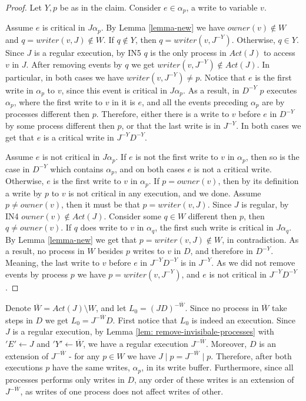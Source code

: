 \begin{proof}
	Let $Y,p$ be as in the claim. Consider $e \in \alpha_p$, a write to variable $v$. 
	
	Assume $e$ is critical in $J \alpha_p$. By Lemma \ref{lemma-new} we have $owner(v) \notin W$ and $q = writer(v,J) \notin W$. If $q \notin Y$, then $q = writer(v,J^{-Y})$. Otherwise, $q \in Y$. Since $J$ is a regular execution, by IN5 $q$ is the only process in $Act(J)$ to access $v$ in $J$. After removing events by $q$ we get $writer(v,J^{-Y}) \notin Act(J)$. In particular, in both cases we have $writer(v,J^{-Y}) \neq p$.
	Notice that $e$ is the first write in $\alpha_p$ to $v$, since this event is critical in $J \alpha_p$. As a result, in $D^{-Y}$ $p$ executes $\alpha_p$, where the first write to $v$ in it is $e$, and all the events preceding $\alpha_p$ are by processes different then $p$. Therefore, either there is a write to $v$ before $e$ in $D^{-Y}$ by some process different then $p$, or that the last write is in $J^{-Y}$. In both cases we get that $e$ is a critical write in $J^{-Y} D^{-Y}$.
	
	Assume $e$ is not critical in $J \alpha_p$. If $e$ is not the first write to $v$ in $\alpha_p$, then so is the case in $D^{-Y}$ which contains $\alpha_p$, and on both cases $e$ is not a critical write. Otherwise, $e$ is the first write to $v$ in $\alpha_p$.
	If $p = owner(v)$, then by its definition a write by $p$ to $v$ is not critical in any execution, and we done. Assume $p \neq owner(v)$, then it must be that $p = writer(v,J)$. Since $J$ is regular, by IN4 $owner(v) \notin Act(J)$. Consider some $q \in W$ different then $p$, then $q \neq owner(v)$. If $q$ does write to $v$ in $\alpha_q$, the first such write is critical in $J \alpha_q$. By Lemma \ref{lemma-new} we get that $p=writer(v,J) \notin W$, in contradiction. As a result, no process in $W$ besides $p$ writes to $v$ in $D$, and therefore in $D^{-Y}$. Meaning, the last write to $v$ before $e$ in $J^{-Y} D^{-Y}$ is in $J^{-Y}$. As we did not remove events by process $p$ we have $p = writer(v,J^{-Y})$, and $e$ is not critical in $J^{-Y} D^{-Y}$.
\end{proof}

Denote $\overline{W} = Act(J) \setminus W$, and let $L_0 = (J D)^{-\overline{W}}$. Since no process in $\overline{W}$ take steps in $D$ we get $L_0 = J^{-\overline{W}} D$.
First notice that $L_0$ is indeed an execution. Since $J$ is a regular execution, by Lemma \ref{lem: remove-invisibale-processes} with $'E' \leftarrow J$ and $'Y' \leftarrow \overline{W}$, we have a regular execution $J^{-\overline{W}}$. Moreover, $D$ is an extension of $J^{-\overline{W}}$ - for any $p \in W$ we have $J \mid p = J^{-\overline{W}} \mid p$. Therefore, after both executions $p$ have the same writes, $\alpha_p$, in its write buffer. Furthermore, since all processes performs only writes in $D$, any order of these writes is an extension of $J^{-\overline{W}}$, as writes of one process does not affect writes of other.

